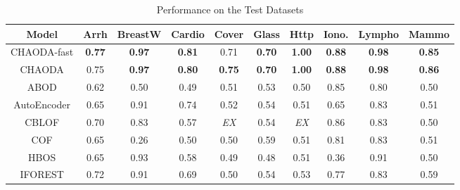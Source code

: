 \begin{table*}[!t]
\renewcommand{\arraystretch}{1.2}
\caption{Performance on the Test Datasets}
\label{table:results:test-performance}
\vskip 0.15in
\begin{center}
\begin{small}
\begin{sc}
\begin{tabular}{|c|c|c|c|c|c|c|c|c|c|}
\hline
\textbf{Model} & \textbf{Arrh} & \textbf{BreastW} & \textbf{Cardio} & \textbf{Cover} & \textbf{Glass} & \textbf{Http} & \textbf{Iono.} & \textbf{Lympho} & \textbf{Mammo} \\
\hline
        CHAODA-fast &       \textbf{0.77} &    \textbf{0.97} &   \textbf{0.81} &           0.71 &  \textbf{0.70} & \textbf{1.00} &                \textbf{0.88} &   \textbf{0.98} &  \textbf{0.85} \\
\hline
        CHAODA &       0.75 &    \textbf{0.97} &   \textbf{0.80} &  \textbf{0.75} &  \textbf{0.70} & \textbf{1.00} &                \textbf{0.88} &   \textbf{0.98} &  \textbf{0.86} \\
\hline
                ABOD &                0.62 &             0.50 &            0.49 &           0.51 &           0.53 &          0.50 &                0.85 &            0.80 &           0.50 \\
\hline
        AutoEncoder &                0.65 &             0.91 &            0.74 &           0.52 &           0.54 &          0.51 &                0.65 &            0.83 &           0.51 \\
\hline
                CBLOF &                0.70 &             0.83 &            0.57 &    \textit{EX} &           0.54 &   \textit{EX} &                0.86 &            0.83 &           0.50 \\
\hline
                COF &                0.65 &             0.26 &            0.50 &           0.50 &           0.59 &          0.51 &                0.81 &            0.83 &           0.51 \\
\hline
                HBOS &                0.65 &             0.93 &            0.58 &           0.49 &           0.48 &          0.51 &                0.36 &            0.91 &           0.50 \\
\hline
        IFOREST &                0.72 &             0.91 &            0.69 &           0.50 &           0.54 &          0.53 &                0.77 &            0.83 &           0.59 \\

\end{tabular}
\end{sc}
\end{small}
\end{center}
\end{table*}
